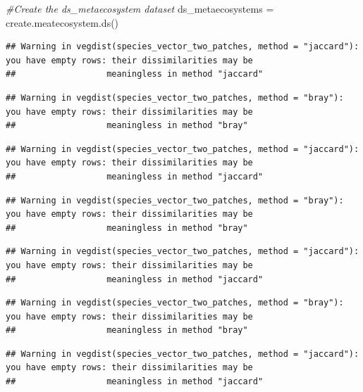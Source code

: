 \documentclass[
]{article}
\newenvironment{Shaded}{\begin{snugshade}}{\end{snugshade}}
\newcommand{\CommentTok}[1]{\textcolor[rgb]{0.56,0.35,0.01}{\textit{#1}}}
\newcommand{\FunctionTok}[1]{\textcolor[rgb]{0.00,0.00,0.00}{#1}}
\newcommand{\NormalTok}[1]{#1}
\newcommand{\OtherTok}[1]{\textcolor[rgb]{0.56,0.35,0.01}{#1}}
\begin{document}
\begin{Shaded}
\begin{Highlighting}[]
\CommentTok{\#Create the ds\_metaecosystem dataset}
\NormalTok{ds\_metaecosystems }\OtherTok{=} \FunctionTok{create.meatecosystem.ds}\NormalTok{()}
\end{Highlighting}
\end{Shaded}

\begin{verbatim}
## Warning in vegdist(species_vector_two_patches, method = "jaccard"): you have empty rows: their dissimilarities may be
##                  meaningless in method "jaccard"
\end{verbatim}

\begin{verbatim}
## Warning in vegdist(species_vector_two_patches, method = "bray"): you have empty rows: their dissimilarities may be
##                  meaningless in method "bray"
\end{verbatim}

\begin{verbatim}
## Warning in vegdist(species_vector_two_patches, method = "jaccard"): you have empty rows: their dissimilarities may be
##                  meaningless in method "jaccard"
\end{verbatim}

\begin{verbatim}
## Warning in vegdist(species_vector_two_patches, method = "bray"): you have empty rows: their dissimilarities may be
##                  meaningless in method "bray"
\end{verbatim}

\begin{verbatim}
## Warning in vegdist(species_vector_two_patches, method = "jaccard"): you have empty rows: their dissimilarities may be
##                  meaningless in method "jaccard"
\end{verbatim}

\begin{verbatim}
## Warning in vegdist(species_vector_two_patches, method = "bray"): you have empty rows: their dissimilarities may be
##                  meaningless in method "bray"
\end{verbatim}

\begin{verbatim}
## Warning in vegdist(species_vector_two_patches, method = "jaccard"): you have empty rows: their dissimilarities may be
##                  meaningless in method "jaccard"
\end{verbatim}
\end{document}
